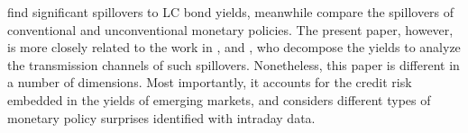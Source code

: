 {\cite{HausmanWongswan:2011} find significant spillovers to LC bond yields, \cite{BowmanLondonoSapriza:2015} meanwhile compare the spillovers of conventional and unconventional monetary policies.
The present paper, however, is more closely related to the work in \cite{CurcuruKaminLiRodriguez:2018}, \cite{ACDM:2019} and \cite{Albaglietal:2019}, who decompose the yields to analyze the transmission channels of such spillovers. 
Nonetheless, this paper is different in a number of dimensions. Most importantly, it accounts for the credit risk embedded in the yields of emerging markets, and considers different types of monetary policy surprises identified with intraday data. 




}
